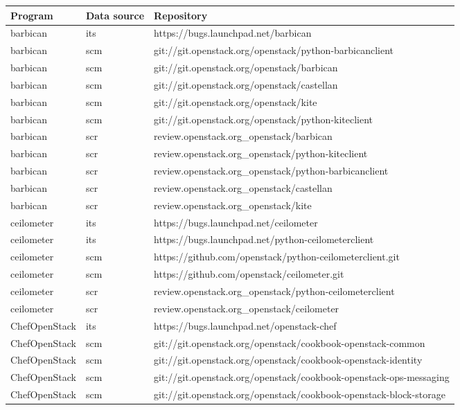 \begin{center}                                                                       
\begin{longtable}{|p{4cm}|p{1cm}|p{10cm}|}
\hline
Program & Data source & Repository \\
\hline

barbican&its&https://bugs.launchpad.net/barbican\\ 
barbican&scm&git://git.openstack.org/openstack/python-barbicanclient\\ 
barbican&scm&git://git.openstack.org/openstack/barbican\\ 
barbican&scm&git://git.openstack.org/openstack/castellan\\ 
barbican&scm&git://git.openstack.org/openstack/kite\\ 
barbican&scm&git://git.openstack.org/openstack/python-kiteclient\\ 
barbican&scr&review.openstack.org\_openstack/barbican\\ 
barbican&scr&review.openstack.org\_openstack/python-kiteclient\\ 
barbican&scr&review.openstack.org\_openstack/python-barbicanclient\\ 
barbican&scr&review.openstack.org\_openstack/castellan\\ 
barbican&scr&review.openstack.org\_openstack/kite\\ 
ceilometer&its&https://bugs.launchpad.net/ceilometer\\ 
ceilometer&its&https://bugs.launchpad.net/python-ceilometerclient\\ 
ceilometer&scm&https://github.com/openstack/python-ceilometerclient.git\\ 
ceilometer&scm&https://github.com/openstack/ceilometer.git\\ 
ceilometer&scr&review.openstack.org\_openstack/python-ceilometerclient\\ 
ceilometer&scr&review.openstack.org\_openstack/ceilometer\\ 
ChefOpenStack&its&https://bugs.launchpad.net/openstack-chef\\ 
ChefOpenStack&scm&git://git.openstack.org/openstack/cookbook-openstack-common\\ 
ChefOpenStack&scm&git://git.openstack.org/openstack/cookbook-openstack-identity\\ 
ChefOpenStack&scm&git://git.openstack.org/openstack/cookbook-openstack-ops-messaging\\ 
ChefOpenStack&scm&git://git.openstack.org/openstack/cookbook-openstack-block-storage\\ 

\end{longtable}
\end{center}
